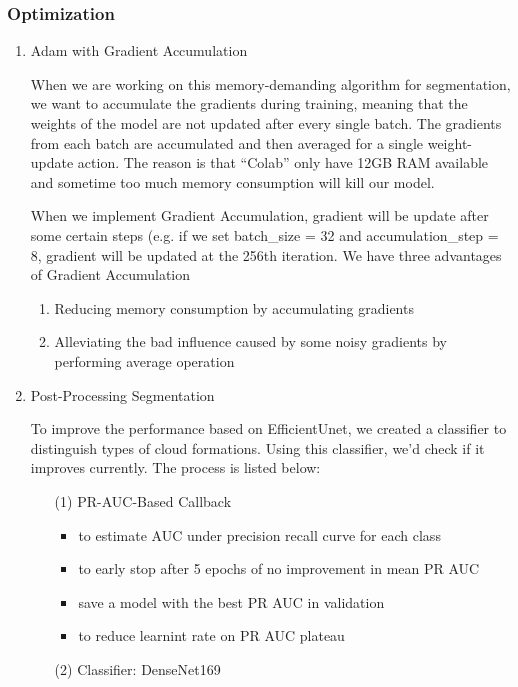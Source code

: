 \documentclass[UTF8]{article}
\begin{document}
	\subsubsection{Optimization}
	\begin{enumerate}
		\item Adam with Gradient Accumulation\par
		\noindent When we are working on this memory-demanding algorithm for segmentation, we want to accumulate the gradients during training, meaning that the weights of the model are not updated after every single batch. The gradients from each batch are accumulated and then averaged for a single weight-update action. The reason is that “Colab” only have 12GB RAM available and sometime too much memory consumption will kill our model.\par
		\noindent When we implement Gradient Accumulation, gradient will be update after some certain steps (e.g. if we set batch\_size = 32 and accumulation\_step = 8, gradient will be updated at the 256th iteration. We have three advantages of Gradient Accumulation
		\begin{enumerate}
			\item Reducing memory consumption by accumulating gradients
			\item Alleviating the bad influence caused by some noisy gradients by performing average operation
		\end{enumerate}
		\item Post-Processing Segmentation\par
		\noindent To improve the performance based on EfficientUnet, we created a classifier to distinguish types of cloud formations. Using this classifier, we’d check if it improves currently. The process is listed below:\par
		\begin{enumerate}
			\item [(1)] PR-AUC-Based Callback
			\begin{itemize}
				\item to estimate AUC under precision recall curve for each class
				\item to early stop after 5 epochs of no improvement in mean PR AUC
				\item save a model with the best PR AUC in validation
				\item to reduce learnint rate on PR AUC plateau
				\end{itemize}
			\item [(2)] Classifier: DenseNet169

\end{enumerate}
\end{enumerate}
\end{document}
